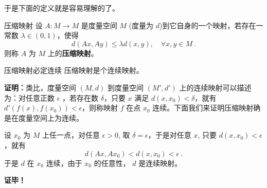 于是下面的定义就是容易理解的了。
\begin{definition}{压缩映射}
设 $A:M\rightarrow M$ 是度量空间 $M$ (度量为 $d$)到它自身的一个映射，若存在一常数 $\lambda\in(0,1)$，使得
\begin{equation}
d(Ax,Ay)\leq \lambda d(x,y),\quad \forall x,y\in M~.
\end{equation}
 则称 $A$ 为 $M$ 上的\textbf{压缩映射}。
\end{definition}
\begin{theorem}{压缩映射必定连续}
压缩映射是个连续映射。
\end{theorem}
\textbf{证明：}类比，度量空间 $(M,d)$ 到度量空间 $(M',d')$ 上的连续映射可以描述为：对任意正数 $\epsilon$ ，若存在数 $\delta$，只要 $x$ 满足 $d(x,x_0)<\delta$，就有 $d'(f(x),f(x_0))<\epsilon$，则称映射 $f$ 在点 $x_0$ 连续。下面我们来证明压缩映射确是在度量空间上为连续。

设 $x_0$ 为 $M$ 上任一点，对任意 $\epsilon>0$, 取 $\delta=\epsilon$，于是对任意 $x$, 只要 $d(x,x_0)<\epsilon$，就有
\begin{equation}
d(A x,A x_0)<d(x,x_0)<\epsilon~.
\end{equation}
于是 $d$ 在 $x_0$ 连续，由于 $x_0$ 的任意性， $d$ 是连续映射。



\textbf{证毕！}